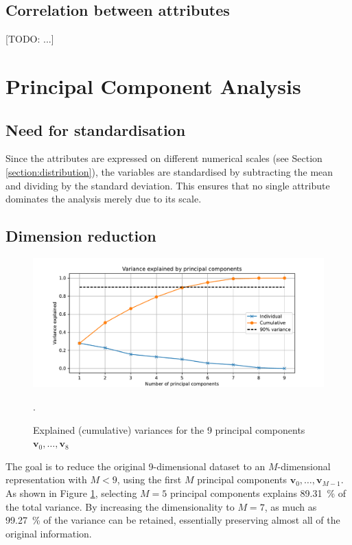 \documentclass[dtu]{dtuarticle}
\newcommand{\todo}[1]{\color{red}[TODO: #1]\color{black}}
\begin{document}
	\subsection{Correlation between attributes}

	\todo{...}

	\section{Principal Component Analysis}

	\subsection{Need for standardisation}

	Since the attributes are expressed on different numerical scales (see Section \ref{section:distribution}), the variables are standardised by subtracting the mean and dividing by the standard deviation. This ensures that no single attribute dominates the analysis merely due to its scale.

	\subsection{Dimension reduction}

	\begin{figure}[h!]
		\includegraphics[width=.9\textwidth]{figures/pca_explained_variance}
		\caption{Explained (cumulative) variances for the 9 principal components $\bm{v}_0,\ldots,\bm{v}_8$}.
		\label{fig:explained-var}
	\end{figure}

	The goal is to reduce the original 9-dimensional dataset to an $M$-dimensional representation with $M < 9$, using the first $M$ principal components $\bm{v}_0,\ldots,\bm{v}_{M-1}$. As shown in Figure \ref{fig:explained-var}, selecting $M=5$ principal components explains \SI{89.31}{\percent} of the total variance. By increasing the dimensionality to $M=7$, as much as \SI{99.27}{\percent} of the variance can be retained, essentially preserving almost all of the original information.
\end{document}
